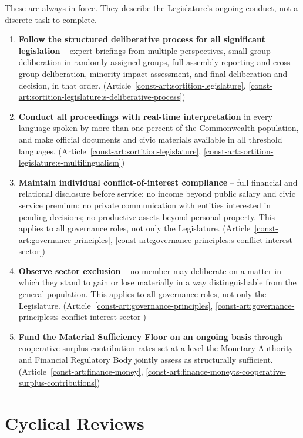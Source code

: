 \documentclass[11pt]{article}
\begin{document}
These are always in force. They describe the Legislature's ongoing conduct, not a discrete task to complete.

\begin{enumerate}
  \item \textbf{Follow the structured deliberative process for all significant legislation} -- expert briefings from multiple perspectives, small-group deliberation in randomly assigned groups, full-assembly reporting and cross-group deliberation, minority impact assessment, and final deliberation and decision, in that order. (Article~\ref{const-art:sortition-legislature}, \ref{const-art:sortition-legislature:s-deliberative-process})
  \item \textbf{Conduct all proceedings with real-time interpretation} in every language spoken by more than one percent of the Commonwealth population, and make official documents and civic materials available in all threshold languages. (Article~\ref{const-art:sortition-legislature}, \ref{const-art:sortition-legislature:s-multilingualism})
  \item \textbf{Maintain individual conflict-of-interest compliance} -- full financial and relational disclosure before service; no income beyond public salary and civic service premium; no private communication with entities interested in pending decisions; no productive assets beyond personal property. This applies to all governance roles, not only the Legislature. (Article~\ref{const-art:governance-principles}, \ref{const-art:governance-principles:s-conflict-interest-sector})
  \item \textbf{Observe sector exclusion} -- no member may deliberate on a matter in which they stand to gain or lose materially in a way distinguishable from the general population. This applies to all governance roles, not only the Legislature. (Article~\ref{const-art:governance-principles}, \ref{const-art:governance-principles:s-conflict-interest-sector})
  \item \textbf{Fund the Material Sufficiency Floor on an ongoing basis} through cooperative surplus contribution rates set at a level the Monetary Authority and Financial Regulatory Body jointly assess as structurally sufficient. (Article~\ref{const-art:finance-money}, \ref{const-art:finance-money:s-cooperative-surplus-contributions})
\end{enumerate}

\section{Cyclical Reviews}
\end{document}
